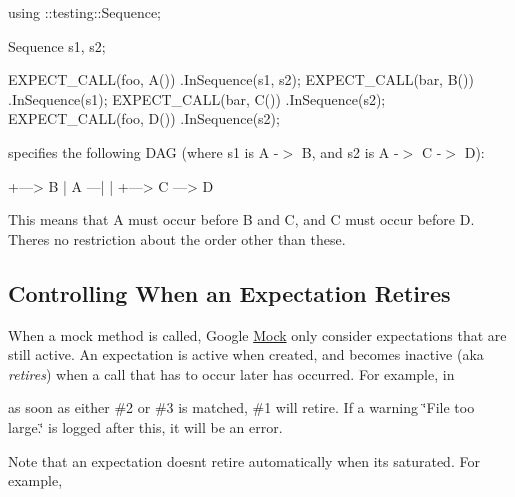 \begin{DoxyCode}
using ::testing::Sequence;

Sequence s1, s2;

EXPECT\_CALL(foo, A())
    .InSequence(s1, s2);
EXPECT\_CALL(bar, B())
    .InSequence(s1);
EXPECT\_CALL(bar, C())
    .InSequence(s2);
EXPECT\_CALL(foo, D())
    .InSequence(s2);
\end{DoxyCode}


specifies the following D\+AG (where {\ttfamily s1} is {\ttfamily A -\/$>$ B}, and {\ttfamily s2} is {\ttfamily A -\/$>$ C -\/$>$ D})\+:


\begin{DoxyCode}
     +---> B
     |
A ---|
     |
     +---> C ---> D
\end{DoxyCode}


This means that A must occur before B and C, and C must occur before D. There\textquotesingle{}s no restriction about the order other than these.

\subsection*{Controlling When an Expectation Retires}

When a mock method is called, Google \hyperlink{classMock}{Mock} only consider expectations that are still active. An expectation is active when created, and becomes inactive (aka {\itshape retires}) when a call that has to occur later has occurred. For example, in




as soon as either \#2 or \#3 is matched, \#1 will retire. If a warning {\ttfamily \char`\"{}\+File too large.\char`\"{}} is logged after this, it will be an error.

Note that an expectation doesn\textquotesingle{}t retire automatically when it\textquotesingle{}s saturated. For example,


